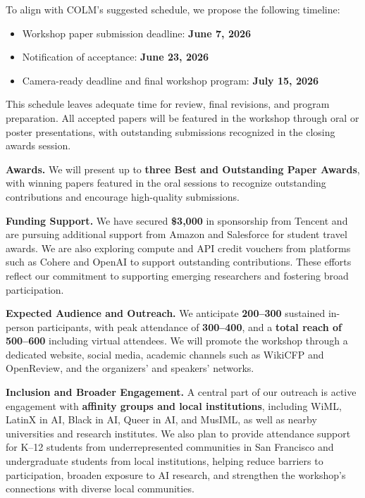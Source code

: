 To align with COLM’s suggested schedule, we propose the following timeline:
\begin{itemize}[topsep=-2pt, partopsep=0pt, leftmargin=*, itemsep=-2pt]
    \item Workshop paper submission deadline: \textbf{June 7, 2026}
    \item Notification of acceptance: \textbf{June 23, 2026}
    \item Camera-ready deadline and final workshop program: \textbf{July 15, 2026}
\end{itemize}
This schedule leaves adequate time for review, final revisions, and program preparation. All accepted papers will be featured in the workshop through oral or poster presentations, with outstanding submissions recognized in the closing awards session.

\noindent\textbf{Awards.}  
We will present up to \textbf{three Best and Outstanding Paper Awards}, with winning papers featured in the oral sessions to recognize outstanding contributions and encourage high-quality submissions.

\noindent\textbf{Funding Support.}  
We have secured \textbf{\$3,000} in sponsorship from Tencent and are pursuing additional support from Amazon and Salesforce for student travel awards. We are also exploring compute and API credit vouchers from platforms such as Cohere and OpenAI to support outstanding contributions. These efforts reflect our commitment to supporting emerging researchers and fostering broad participation.

\noindent\textbf{Expected Audience and Outreach.}
We anticipate \textbf{200--300} sustained in-person participants, with peak attendance of \textbf{300--400}, and a \textbf{total reach of 500--600} including virtual attendees. We will promote the workshop through a dedicated website, social media, academic channels such as WikiCFP and OpenReview, and the organizers’ and speakers’ networks.

\noindent\textbf{Inclusion and Broader Engagement.}  
A central part of our outreach is active engagement with \textbf{affinity groups and local institutions}, including WiML, LatinX in AI, Black in AI, Queer in AI, and MusIML, as well as nearby universities and research institutes. We also plan to provide attendance support for K--12 students from underrepresented communities in San Francisco and undergraduate students from local institutions, helping reduce barriers to participation, broaden exposure to AI research, and strengthen the workshop’s connections with diverse local communities.

